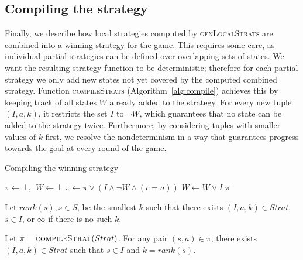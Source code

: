 \subsection{Compiling the strategy}

Finally, we describe how local strategies computed by
\textsc{genLocalStrats} are combined into a winning strategy for
the game.  This requires some care, as individual partial
strategies can be defined over overlapping sets of states.  We
want the resulting strategy function to be deterministic;
therefore for each partial strategy we only add new states not yet
covered by the computed combined strategy.  Function
\textsc{compileStrats} (Algorithm~\ref{alg:compile}) achieves this by keeping track of all
states $W$ already added to the strategy.  For every new tuple $(I, a,
k)$, it restricts the set $I$ to $\neg W$, which guarantees that no
state can be added to the strategy twice.  Furthermore, by
considering tuples with smaller values of $k$ first, we resolve the
nondeterminism in a way that guarantees progress towards the goal
at every round of the game.

\begin{algorithm}[t]
   \caption{Compiling the  winning strategy}\label{alg:compile}
   \begin{algorithmic}[1]
            \State $\pi \gets \bot,~~W \gets \bot$
             
                \State $\pi \gets \pi \lor (I \land \neg W \land (c=a))$
                \State $W \gets W \lor I$
            \EndFor
            \State \Return $\pi$
        \EndFunction
    \end{algorithmic}
\end{algorithm}

Let $rank(s), s\in S$, be the smallest $k$ such that there exists
$(I,a,k) \in Strat$, $s \in I$, or $\infty$ if there is no such
$k$.

\begin{proposition}\label{prop:rank}
    Let $\pi=\textsc{compileStrat}(Strat)$. For any pair $(s,a)
    \in \pi$, there exists $(I, a, k) \in Strat$ such that $s\in
    I$ and $k=rank(s)$.
\end{proposition}


